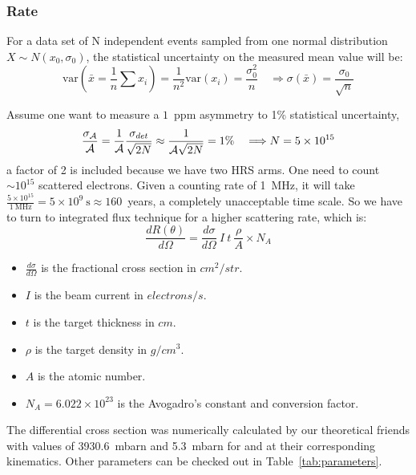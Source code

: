 \subsubsection{Rate}
For a data set of N independent events sampled from one normal distribution 
$X\sim N(x_0, \sigma_0)$, the statistical uncertainty on the measured mean value
will be:
$$ \text{var}(\bar{x} = \frac{1}{n}\sum x_i) = \frac{1}{n^2}\text{var}(x_i) = \frac{\sigma_0^2}{n} 
\quad \Longrightarrow \sigma(\bar{x}) = \frac{\sigma_0}{\sqrt{n}} $$

Assume one want to measure a $1$~ppm asymmetry to 1\% statistical uncertainty,
\begin{equation}
    \frac{\sigma_{\mathcal{A}}}{\mathcal{A}} = \frac{1}{\mathcal{A}}\frac{\sigma_{det}}{\sqrt{2N}} 
    \approx \frac{1}{\mathcal{A}\sqrt{2N}} = 1\% \quad 
    \Longrightarrow N = 5 \times 10^{15} 
    \label{eq:statistical_error}
\end{equation}
a factor of 2 is included because we have two HRS arms.
One need to count $\sim10^{15}$ scattered electrons. Given a counting rate of 1~MHz, 
it will take $\frac{5\times 10^{15}}{1\ \mathrm{MHz}} = 5\times 10^{9}\ \mathrm{s} \approx 160$~years,
a completely unacceptable time scale. So we have to turn to integrated flux technique
for a higher scattering rate, which is:
\begin{equation}
    \frac{dR(\theta)}{d\Omega} = \frac{d\sigma}{d\Omega}\ I\ t\ \frac{\rho}{A} \times N_A   
\end{equation}
\begin{itemize}
    \item $\frac{d\sigma}{d\Omega}$ is the fractional cross section in $cm^2/str$.
    \item $I$ is the beam current in $electrons/s$.
    \item $t$ is the target thickness in $cm$.
    \item $\rho$ is the target density in $g/cm^{3}$.
    \item $A$ is the atomic number.
    \item $N_A = 6.022\times 10^{23}$ is the Avogadro's constant and conversion factor.
\end{itemize}

The differential cross section was numerically calculated by our theoretical friends
with values of 3930.6~mbarn and 5.3~mbarn for \Pb and \Ca at their corresponding
kinematics. Other parameters can be checked out in Table~\ref{tab:parameters}.

